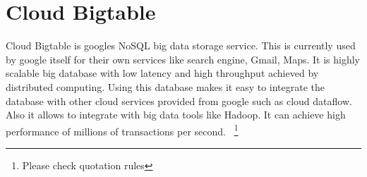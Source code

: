 \section{Cloud Bigtable}

Cloud Bigtable is googles NoSQL big data storage service. This is currently
used by google itself for their own services like search engine, Gmail, Maps.
It is highly scalable big database with low latency and high throughput achieved
by distributed computing. Using this database makes it easy to integrate the
database with other cloud services provided from google such as cloud dataflow.
Also it allows to integrate with big data tools like Hadoop. It can achieve high
 performance of millions of transactions per second.
~\cite{hid-sp18-502-GoogleCloudBigtable}\footnote{Please check quotation rules}



